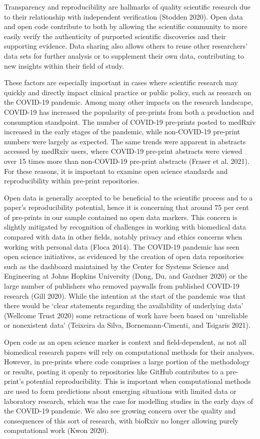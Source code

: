 \documentclass[
]{article}
\begin{document}
Transparency and reproducibility are hallmarks of quality scientific research due to their relationship with independent verification (Stodden 2020). Open data and open code contribute to both by allowing the scientific community to more easily verify the authenticity of purported scientific discoveries and their supporting evidence. Data sharing also allows others to reuse other researchers' data sets for further analysis or to supplement their own data, contributing to new insights within their field of study.

These factors are especially important in cases where scientific research may quickly and directly impact clinical practice or public policy, such as research on the COVID-19 pandemic. Among many other impacts on the research landscape, COVID-19 has increased the popularity of pre-prints from both a production and consumption standpoint. The number of COVID-19 pre-prints posted to medRxiv increased in the early stages of the pandemic, while non-COVID-19 pre-print numbers were largely as expected. The same trends were apparent in abstracts accessed by medRxiv users, where COVID-19 pre-print abstracts were viewed over 15 times more than non-COVID-19 pre-print abstracts (Fraser et al. 2021). For these reasons, it is important to examine open science standards and reproducibility within pre-print repositories.

Open data is generally accepted to be beneficial to the scientific process and to a paper's reproducibility potential, hence it is concerning that around 75 per cent of pre-prints in our sample contained no open data markers. This concern is slightly mitigated by recognition of challenges in working with biomedical data compared with data in other fields, notably privacy and ethics concerns when working with personal data (Floca 2014). The COVID-19 pandemic has seen open science initiatives, as evidenced by the creation of open data repositories such as the dashboard maintained by the Center for Systems Science and Engineering at Johns Hopkins University (Dong, Du, and Gardner 2020) or the large number of publishers who removed paywalls from published COVID-19 research (Gill 2020). While the intention at the start of the pandemic was that there would be `clear statements regarding the availability of underlying data' (Wellcome Trust 2020) some retractions of work have been based on `unreliable or nonexistent data' (Teixeira da Silva, Bornemann-Cimenti, and Tsigaris 2021).

Open code as an open science marker is context and field-dependent, as not all biomedical research papers will rely on computational methods for their analyses. However, in pre-prints where code comprises a large portion of the methodology or results, posting it openly to repositories like GitHub contributes to a pre-print's potential reproducibility. This is important when computational methods are used to form predictions about emerging situations with limited data or laboratory research, which was the case for modelling studies in the early days of the COVID-19 pandemic. We also see growing concern over the quality and consequences of this sort of research, with bioRxiv no longer allowing purely computational work (Kwon 2020).
\end{document}
